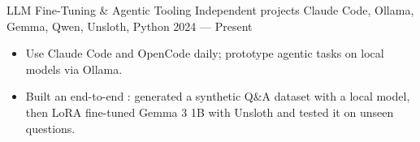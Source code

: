 \showoff
{LLM Fine-Tuning \& Agentic Tooling}
{Independent projects}
{Claude Code, Ollama, Gemma, Qwen, Unsloth, Python}
{2024 --- Present}

\begin{itemize}
    \item Use Claude Code and OpenCode daily; prototype agentic tasks on local models via Ollama.
    \item Built an end-to-end : generated a synthetic Q\&A dataset with a local model, then LoRA fine-tuned Gemma 3 1B with Unsloth and tested it on unseen questions.
\end{itemize}
